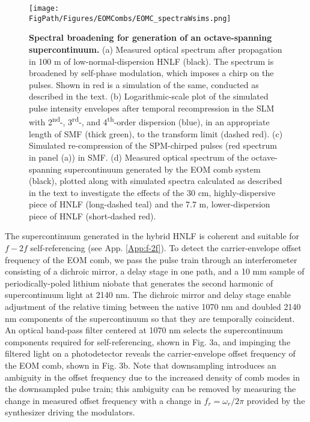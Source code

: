 \begin{figure}[htpb]
	\begin{center}
		\texttt{[image: \\FigPath/Figures/EOMCombs/EOMC\_spectraWsims.png]}
	\end{center}
	\caption[Figure Title]{\textbf{Spectral broadening for generation of an octave-spanning supercontinuum.} (a) Measured optical spectrum after propagation in 100 m of low-normal-dispersion HNLF (black). The spectrum is broadened by self-phase modulation, which imposes a chirp on the pulses. Shown in red is a simulation of the same, conducted as described in the text. (b) Logarithmic-scale plot of the simulated pulse intensity envelopes after temporal recompression in the SLM with 2\textsuperscript{nd}-, 3\textsuperscript{rd}-, and 4\textsuperscript{th}-order dispersion (blue), in an appropriate length of SMF (thick green), to the transform limit (dashed red). (c) Simulated re-compression of the SPM-chirped pulses (red spectrum in panel (a)) in SMF. (d) Measured optical spectrum of the octave-spanning supercontinuum generated by the EOM comb system (black), plotted along with simulated spectra calculated as described in the text to investigate the effects of the 30 cm, highly-dispersive piece of HNLF (long-dashed teal) and the 7.7 m, lower-dispersion piece of HNLF (short-dashed red).}
	\label{fig:EOMC_Broadening}
\end{figure} 

The supercontinuum generated in the hybrid HNLF is coherent and suitable for $f-2f$ self-referencing (see App. \ref{App:f-2f}). To detect the carrier-envelope offset frequency of the EOM comb, we pass the pulse train through an interferometer consisting of a dichroic mirror, a delay stage in one path, and a 10 mm sample of periodically-poled lithium niobate that generates the second harmonic of supercontinuum light at 2140 nm.  The dichroic mirror and delay stage enable adjustment of the relative timing between the native 1070 nm and doubled 2140 nm components of the supercontinuum so that they are temporally coincident. An optical band-pass filter centered at 1070 nm selects the supercontinuum components required for self-referencing, shown in Fig. 3a, and impinging the filtered light on a photodetector reveals the carrier-envelope offset frequency of the EOM comb, shown in Fig. 3b. Note that downsampling introduces an ambiguity in the offset frequency due to the increased density of comb modes in the downsampled pulse train; this ambiguity can be removed by measuring the change in measured offset frequency with a change in $f_r=\omega_r/2\pi$ provided by the synthesizer driving the modulators. 




